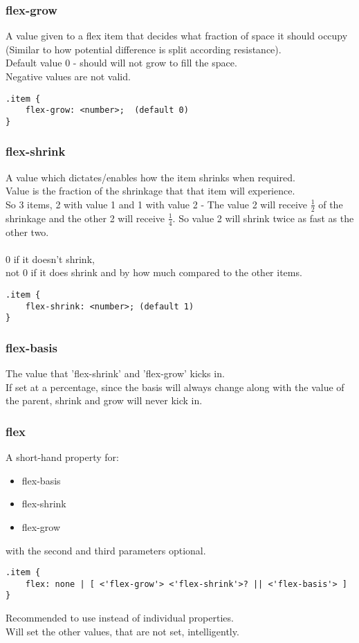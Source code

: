 \documentclass[]{article}
\newcommand{\<}{\guilsinglleft}
\renewcommand{\>}{\guilsinglright}
\begin{document}
\subsubsection{flex-grow}
A value given to a flex item that decides what fraction of space it should occupy (Similar to how potential difference is split according resistance).
\\
Default value 0 - should will not grow to fill the space.
\\
Negative values are not valid.
\begin{lstlisting}
.item {
	flex-grow: <number>;  (default 0) 
}
\end{lstlisting}

\subsubsection{flex-shrink}
A value which dictates/enables how the item shrinks when required.
\\
Value is the fraction of the shrinkage that that item will experience.
\\
So 3 items, 2 with value 1 and 1 with value 2 - The value 2 will receive $\frac{1}{2}$ of the shrinkage and the other 2 will receive $\frac{1}{4}$.  So value 2 will shrink twice as fast as the other two.
\\\\
0 if it doesn't shrink, \\
not 0 if it does shrink and by how much compared to the other items.
\begin{lstlisting}
.item {
	flex-shrink: <number>; (default 1)
}
\end{lstlisting}

\subsubsection{flex-basis}
The value that 'flex-shrink' and 'flex-grow' kicks in.
\\
If set at a percentage, since the basis will always change along with the value of the parent, shrink and grow will never kick in.

\subsubsection{flex}
A short-hand property for:
\begin{itemize}
	\item flex-basis
	\item flex-shrink
	\item flex-grow
\end{itemize}
with the second and third parameters optional.
\begin{lstlisting}
.item {
	flex: none | [ <'flex-grow'> <'flex-shrink'>? || <'flex-basis'> ]
}
\end{lstlisting}
Recommended to use instead of individual properties.
\\
Will set the other values, that are not set, intelligently.
\end{document}

